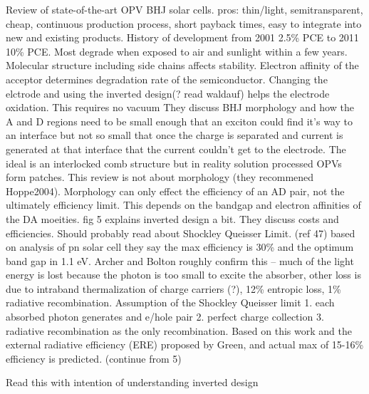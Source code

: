 \documentclass{article}
\begin{document}
Review of state-of-the-art OPV BHJ solar cells. 
pros: thin/light, semitransparent, cheap, continuous production process, short payback times, easy to integrate into new and existing products. 
History of development from 2001 2.5\% PCE to 2011 10\% PCE. Most degrade when exposed to air and sunlight within a few years. Molecular structure including side chains affects stability. Electron affinity of the acceptor determines degradation rate of the semiconductor. Changing the elctrode and using the inverted design(? read waldauf) helps the electrode oxidation. This requires no vacuum
They discuss BHJ morphology and how the A and D regions need to be small enough that an exciton could find it's way to an interface but not so small that once the charge is separated and current is generated at that interface that the current couldn't get to the electrode. The ideal is an interlocked comb structure but in reality solution processed OPVs form patches. This review is not about morphology (they recommened Hoppe2004). Morphology can only effect the efficiency of an AD pair, not the ultimately efficiency limit. This depends on the bandgap and electron affinities of the DA moeities.
fig 5 explains inverted design a bit. 
They discuss costs and efficiencies. Should probably read about Shockley Queisser Limit. (ref 47) based on analysis of pn solar cell they say the max efficiency is 30\% and the optimum band gap in 1.1 eV. Archer and Bolton roughly confirm this -- much of the light energy is lost because the photon is too small to excite the absorber, other loss is due to intraband thermalization of charge carriers (?), 12\% entropic loss, 1\% radiative recombination. Assumption of the Shockley Queisser limit
1. each absorbed photon generates and e/hole pair
2. perfect charge collection
3. radiative recombination as the only recombination.
Based on this work and the external radiative efficiency (ERE) proposed by Green, and actual max of 15-16\% efficiency is predicted.
(continue from 5)

\cite{Waldauf2006}

Read this with intention of understanding inverted design

\cite{Hoppe2004}
\end{document}
